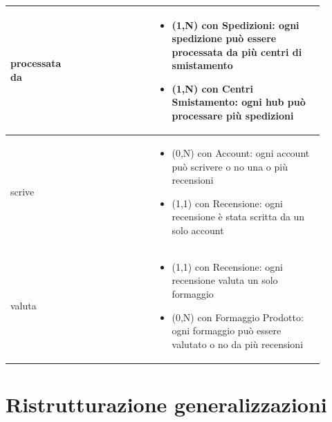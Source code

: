 \documentclass[12pt,a4paper]{article}
\begin{document}
\begin{center}
\begin{longtable}{|p{0.16\linewidth}|p{0.24\linewidth}|p{0.50\linewidth}|}
\hline
processata da 				& \begin{flushleft}\vspace{-15pt}  \end{flushleft}
					& \begin{itemize}
						\setlength{\itemindent}{-1em}
						\vspace{-25pt}
						\setlength\itemsep{-0.25em}
						\item (1,N) con Spedizioni: ogni spedizione può essere processata da più centri di smistamento
						\item (1,N) con Centri Smistamento: ogni hub può processare più spedizioni
					\end{itemize}\\ 

\hline
scrive 				& \begin{flushleft}\vspace{-15pt}  \end{flushleft}
					& \begin{itemize}
						\setlength{\itemindent}{-1em}
						\vspace{-25pt}
						\setlength\itemsep{-0.25em}
						\item (0,N) con Account: ogni account può scrivere o no una o più recensioni
						\item (1,1) con Recensione: ogni recensione è stata scritta da un solo account
					\end{itemize}\\ 

\hline
valuta 				& \begin{flushleft}\vspace{-15pt}  \end{flushleft}
					& \begin{itemize}
						\setlength{\itemindent}{-1em}
						\vspace{-25pt}
						\setlength\itemsep{-0.25em}
						\item (1,1) con Recensione: ogni recensione valuta un solo formaggio
						\item (0,N) con Formaggio Prodotto: ogni formaggio può essere valutato o no da più recensioni
					\end{itemize}\\ 

\hline

\end{longtable}
\end{center}
\pagebreak
\section{Ristrutturazione generalizzazioni}
\label{sec:ristrutturazione}
\end{document}
